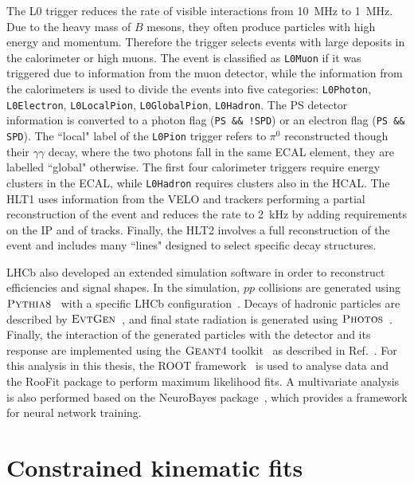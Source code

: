 The L0 trigger reduces the rate of visible interactions from 10~MHz to 1~MHz.
Due to the heavy mass of $B$ mesons, they often produce particles with high energy and momentum.
Therefore the trigger selects events with large deposits in the calorimeter
or high \pt muons. The event is classified as \verb!L0Muon! if it was triggered due to information
from the muon detector, while the information from the calorimeters is used to divide the
events into five categories: \verb!L0Photon!, \verb!L0Electron!, \verb!L0LocalPion!, 
\verb!L0GlobalPion!, \verb!L0Hadron!. The PS detector information is converted to a photon flag 
(\verb|PS && !SPD|) or an electron flag (\verb|PS && SPD|). The ``local" label of the \verb!L0Pion! trigger 
refers to $\pi^0$ reconstructed though their $\gamma\gamma$ decay, where the two photons fall in the 
same ECAL element, they are labelled ``global" otherwise. The first four calorimeter triggers require 
energy clusters in the ECAL, while \verb!L0Hadron! requires clusters also in the HCAL. 
The HLT1 uses information from the VELO and trackers performing a partial reconstruction 
of the event and reduces the rate to 2~kHz by adding requirements on the IP and \chisq of tracks.
Finally, the HLT2 involves a full reconstruction of the event and includes many ``lines" designed 
to select specific decay structures.

LHCb also developed an extended simulation software in order to reconstruct efficiencies and signal shapes.
In the simulation, $pp$ collisions are generated using $\textsc{Pythia}8$~\cite{Sjostrand:2006za,Sjostrand:2007gs} with a specific
LHCb configuration~\cite{LHCb-PROC-2010-056}. Decays of hadronic particles are described by $\textsc{EvtGen}$~\cite{Lange:2001uf},
and final state radiation is generated using $\textsc{Photos}$~\cite{Golonka:2005pn}. Finally, the interaction of the generated
particles with the detector and its response are implemented using the $\textsc{Geant4}$ toolkit~\cite{Allison:2006ve}
as described in Ref.~\cite{LHCb-PROC-2011-006}. For this analysis in this thesis, the ROOT framework~\cite{Brun:2000es} is
used to analyse data and the RooFit package to perform maximum likelihood fits. A multivariate analysis is also performed
based on the NeuroBayes package~\cite{Feindt:2006pm,feindt-2004}, which provides a framework for neural network training.

\section{Constrained kinematic fits}
\label{sec:DTF}

